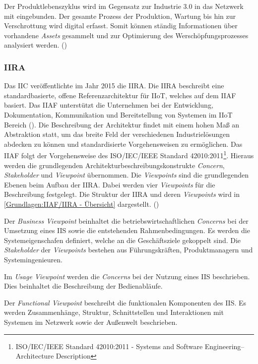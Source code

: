 Der Produktlebenszyklus wird im Gegensatz zur Industrie 3.0 in das Netzwerk mit eingebunden. Der gesamte Prozess der Produktion, Wartung bis hin zur Verschrottung wird digital erfasst. Somit können ständig Informationen über vorhandene \textit{Assets} gesammelt und zur Optimierung des Werschöpfungsprozesses analysiert werden. (\cite{RAMISpec})

\subsubsection{IIRA}
\label{Grundlagen:IIRA}
Das \ac{IIC} veröffentlichte im Jahr 2015 die \ac{IIRA}. Die \ac{IIRA} beschreibt eine standardbasierte, offene Referenzarchitektur für \ac{IIoT}, welches auf dem \ac{IIAF} basiert. Das \ac{IIAF} unterstützt die Unternehmen bei der Entwicklung, Dokumentation, Kommunikation und Bereitstellung von Systemen im \ac{IIoT} Bereich (\cite{iira2017}). Die Beschreibung der Architektur findet mit einem hohen Maß an Abstraktion statt, um das breite Feld der verschiedenen Industrielösungen abdecken zu können und standardisierte Vorgehensweisen zu ermöglichen. Das \ac{IIAF} folgt der Vorgehensweise des \ac{ISO}/\ac{IEC}/\ac{IEEE} Standard 42010:2011\footnote{ISO/IEC/IEEE Standard 42010:2011 - Systems and Software Engineering–Architecture Description}. Hieraus werden die grundlegenden Architekturbeschreibungskonstrukte \textit{Concern}, \textit{Stakeholder} und \textit{Viewpoint} übernommen. Die \textit{Viewpoints} sind die grundlegenden Ebenen beim Aufbau der \ac{IIRA}. Dabei werden vier \textit{Viewpoints} für die Beschreibung festgelegt. Die Struktur der \ac{IIRA} und deren \textit{Viewpoints} wird in \autoref{Grundlagen:IIAF/IIRA - Übersicht} dargestellt. (\cite{heidrich2016})

Der \textit{Business Viewpoint} beinhaltet die betriebswirtschaftlichen \textit{Concerns} bei der Umsetzung eines \ac{IIS} sowie die entstehenden Rahmenbedingungen. Es werden die Systemeigenschafen definiert, welche an die Geschäftsziele gekoppelt sind. Die \textit{Stakeholder} der \textit{Viewpoints} bestehen aus Führungskräften, Produktmanagern und Systemingenieuren.

Im \textit{Usage Viewpoint} werden die \textit{Concerns} bei der Nutzung eines \ac{IIS} beschrieben. Dies beinhaltet die Beschreibung der Bedienabläufe.

Der \textit{Functional Viewpoint} beschreibt die funktionalen Komponenten des \ac{IIS}. Es werden Zusammenhänge, Struktur, Schnittstellen und Interaktionen mit Systemen im Netzwerk sowie der Außenwelt beschrieben.

